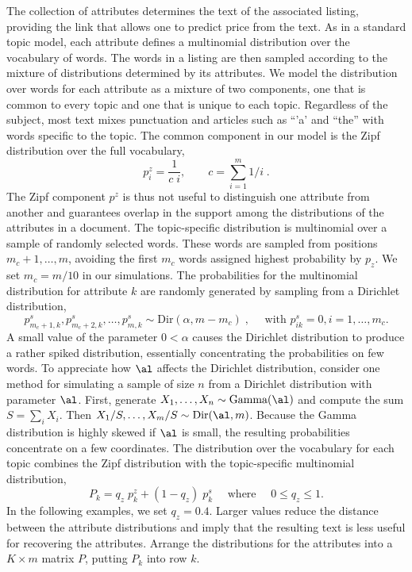 \documentclass[12pt]{article}
\begin{document}
The collection of attributes determines the text of the associated listing, providing the link that allows one to predict  price from the text.  As in a standard topic model, each attribute defines a multinomial distribution over the vocabulary of words.  The words in a listing are then sampled according to the mixture of distributions determined by its attributes.  We model the distribution over words for each attribute as a mixture of two components, one that is common to every topic and one that is unique to each topic.  Regardless of the subject, most text mixes punctuation and articles such as ``'a' and ``the'' with words specific to the topic.  The common component in our model is the Zipf distribution over the full vocabulary,
\begin{equation*}
     p^z_i = \frac{1}{c\;i}, \qquad c = \sum_{i=1}^{m} 1/i \;.
\end{equation*}
The Zipf component $p^z$ is thus not useful to distinguish one attribute from another and guarantees overlap in the support among the distributions of the attributes in a document.  The topic-specific  distribution is multinomial over a sample of randomly selected words.  These words are sampled from  positions $m_c+1, \ldots, m$, avoiding the first $m_c$ words assigned highest probability by $p_z$. We set $m_c = m/10$ in our simulations. The probabilities for the multinomial distribution for attribute $k$ are randomly generated by sampling from a Dirichlet distribution,  
 \begin{equation}
     p^s_{m_c+1,k},p^s_{m_c+2,k}, \ldots, p^s_{m,k} \sim  
         \mbox{Dir}(\alpha,m-m_c)  \;, \quad \mbox{ with } p^s_{ik} = 0, i = 1,\ldots,m_c.
\label{eq:ps}
\end{equation}
A small value of the parameter $0 < \alpha$ causes the Dirichlet distribution to produce a rather spiked distribution, essentially concentrating the probabilities on few words.   To appreciate how $\al$ affects the Dirichlet distribution, consider one method for simulating a sample of size $n$ from a Dirichlet distribution with parameter $\al$.  First, generate $X_1,\ldots,X_n \sim \mbox{Gamma}(\al)$ and compute the sum $S = \sum_i X_i$.  Then $X_1/S,\ldots,X_m/S \sim \mbox{Dir}(\al,m)$.  Because the Gamma distribution is highly skewed if $\al$ is small,  the resulting probabilities concentrate on a few coordinates. The distribution over the vocabulary for each topic combines the Zipf distribution with the topic-specific multinomial distribution,
\begin{equation}
  P_k = q_z \; p_k^z + (1-q_z) \; p_k^s  \quad \mbox{ where } \quad 0 \le q_z \le 1.
  \label{eq:Pk}
\end{equation}
In the following examples, we set $q_z = 0.4$.  Larger values reduce the distance between the attribute distributions and imply that the resulting text is less useful for recovering the attributes.   Arrange the distributions for the attributes into a $K \times m$ matrix $P$, putting $P_k$ into row $k$.
\end{document}
